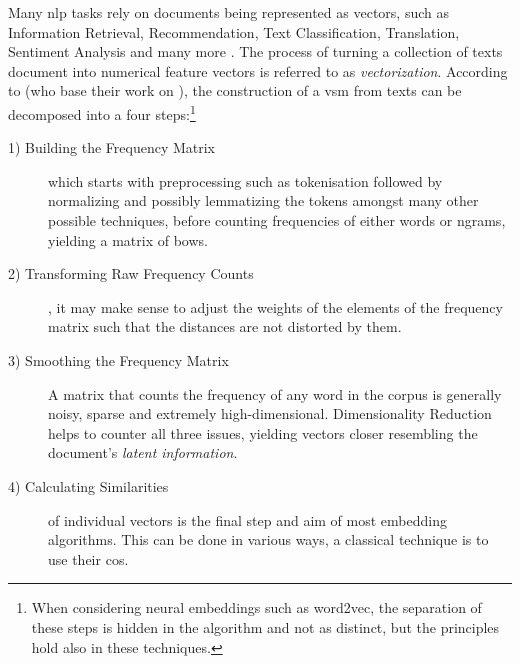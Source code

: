 Many \gls{nlp} tasks rely on documents being represented as vectors, such as Information Retrieval, Recommendation, Text Classification, Translation, Sentiment Analysis and many more \cite{Smith2017,bird2009natural,Devlin2019,Le2014,Mikolov2013a,Turney2010,Guo,Chen2018,Maas2011}. The process of turning a collection of texts document into numerical feature vectors is referred to as \textit{vectorization}. According to \textcite{Turney2010} (who base their work on \textcite{Lowe}), the construction of a \gls{vsm} from texts can be decomposed into a four steps:\footnote{When considering neural embeddings such as \gls{word2vec}, the separation of these steps is hidden in the algorithm and not as distinct, but the principles hold also in these techniques.}


\begin{description}
    \item[1) Building the Frequency Matrix] which starts with preprocessing such as tokenisation followed by normalizing and possibly \gls{lemma}tizing the tokens amongst many other possible techniques, before counting frequencies of either words or \glspl{ngram}, yielding a matrix of \glspl{bow}.
    \item[2) Transforming Raw Frequency Counts]  \cite{Turney2010}, it may make sense to adjust the weights of the elements of the frequency matrix such that the distances are not distorted by them.
    \item[3) Smoothing the Frequency Matrix] A matrix that counts the frequency of any word in the corpus is generally noisy, sparse and extremely high-dimensional. Dimensionality Reduction helps to counter all three issues, yielding vectors closer resembling the document's \textit{latent information}.
    \item[4) Calculating Similarities] of individual vectors is the final step and aim of most embedding algorithms. This can be done in various ways, a classical technique is to use their \gls{cos}.
\end{description}

